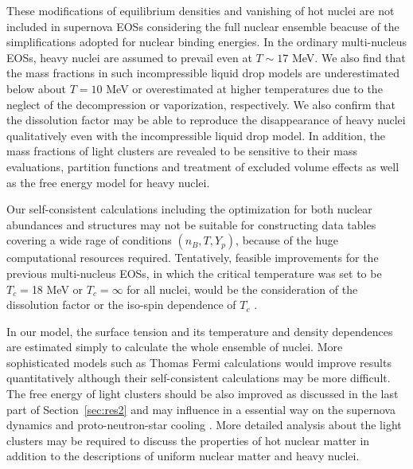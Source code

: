 \documentclass[preprint]{revtex4}
\begin{document}
{{{These modifications of equilibrium densities and vanishing of hot nuclei are not included in supernova EOSs considering
 the full nuclear ensemble beacuse of the simplifications adopted for nuclear binding energies.
In the ordinary multi-nucleus EOSs,  heavy nuclei are assumed to prevail even at $T \sim 17$ MeV.
We also find that the mass fractions in such incompressible liquid drop models
are underestimated below about $T=10$ MeV or overestimated at higher temperatures due to the neglect of the decompression or vaporization, respectively.
{%
We also confirm that  the dissolution factor  \cite{pais16}  may be able to  reproduce the disappearance of heavy nuclei qualitatively even with the incompressible liquid drop model.
In addition,  the mass fractions of light clusters are revealed to be sensitive to their mass evaluations, partition functions and treatment of excluded volume effects
as well as the free energy model for heavy nuclei.}


Our self-consistent calculations including  the optimization for both nuclear abundances and
 structures may not be  suitable for constructing data tables covering a wide rage of
conditions $(n_B,T,Y_p)$,
 because of the huge computational resources required.
{%
Tentatively, feasible improvements for  the previous multi-nucleus EOSs,
 in which the critical temperature 
was set to be $T_c=$18 MeV  \cite{buyukcizmeci14,furusawa17a, furusawa17d} or 
 $T_c= \infty$ \cite{hempel10, steiner13} for all nuclei, would be the consideration of  the dissolution factor \cite{pais16}  or  the iso-spin dependence of $T_c$
\cite{schneider17}.}

In our model, the surface tension and its temperature and density dependences are estimated simply to calculate the whole ensemble of nuclei.
  More sophisticated models such as Thomas Fermi calculations would improve results quantitatively  although their self-consistent calculations may be more difficult.  
{%
The free energy of light clusters should be also improved as discussed in the last  part of Section~\ref{sec:res2} and
 may influence in a essential way  on the supernova dynamics
 and proto-neutron-star cooling \cite{sumiyoshi08,typel10,furusawa13b}.
More detailed analysis about the light clusters \cite{typel10,hempel11,typel17, avancini17}
 may be required to discuss the properties of  hot nuclear matter in addition to the descriptions of uniform nuclear matter and heavy nuclei.}

}}}
\end{document}
